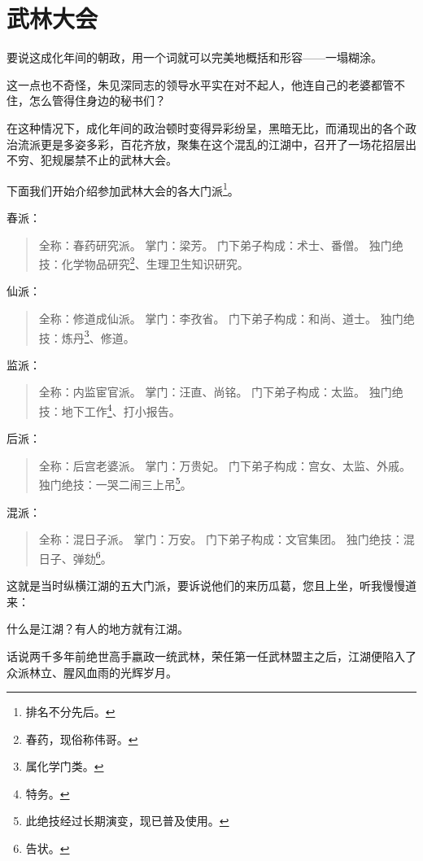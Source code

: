 \section{武林大会}
\ifnum{}
	\begin{multicols}{\theparacolNo}
		\fi
		要说这成化年间的朝政，用一个词就可以完美地概括和形容——一塌糊涂。

		这一点也不奇怪，朱见深同志的领导水平实在对不起人，他连自己的老婆都管不住，怎么管得住身边的秘书们？

		在这种情况下，成化年间的政治顿时变得异彩纷呈，黑暗无比，而涌现出的各个政治流派更是多姿多彩，百花齐放，聚集在这个混乱的江湖中，召开了一场花招层出不穷、犯规屡禁不止的武林大会。

		下面我们开始介绍参加武林大会的各大门派\footnote{排名不分先后。}。

		春派：
		{\footnotesize \begin{quote}
			全称：春药研究派。
			掌门：梁芳。
			门下弟子构成：术士、番僧。
			独门绝技：化学物品研究\footnote{春药，现俗称伟哥。}、生理卫生知识研究。
		\end{quote}}

		仙派：
		{\footnotesize \begin{quote}
			全称：修道成仙派。
			掌门：李孜省。
			门下弟子构成：和尚、道士。
			独门绝技：炼丹\footnote{属化学门类。}、修道。
		\end{quote}}

		监派：
		{\footnotesize \begin{quote}
			全称：内监宦官派。
			掌门：汪直、尚铭。
			门下弟子构成：太监。
			独门绝技：地下工作\footnote{特务。}、打小报告。
		\end{quote}}

		后派：
		{\footnotesize \begin{quote}
			全称：后宫老婆派。
			掌门：万贵妃。
			门下弟子构成：宫女、太监、外戚。
			独门绝技：一哭二闹三上吊\footnote{此绝技经过长期演变，现已普及使用。}。
		\end{quote}}

		混派：
		{\footnotesize \begin{quote}
			全称：混日子派。
			掌门：万安。
			门下弟子构成：文官集团。
			独门绝技：混日子、弹劾\footnote{告状。}。
		\end{quote}}

		这就是当时纵横江湖的五大门派，要诉说他们的来历瓜葛，您且上坐，听我慢慢道来：

		什么是江湖？有人的地方就有江湖。

		话说两千多年前绝世高手嬴政一统武林，荣任第一任武林盟主之后，江湖便陷入了众派林立、腥风血雨的光辉岁月。


\end{multicols}
